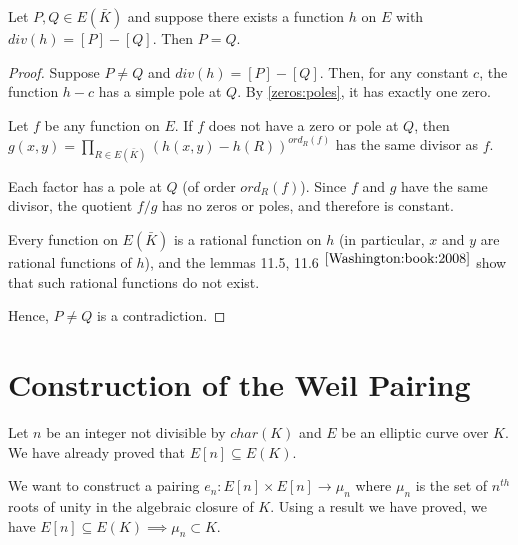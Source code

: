 \begin{lemma}
    Let $P, Q \in E(\bar{K})$ and suppose there exists a function $h$ on $E$ with $div(h) = [P] - [Q]$. Then $P = Q$.
\end{lemma}

\begin{proof}
    Suppose $P \neq Q$ and $div(h) = [P] - [Q]$. Then, for any constant $c$, the function $h - c$ has a simple pole at $Q$. By \ref{zeros:poles}, it has exactly one zero.  

    Let $f$ be any function on $E$. If $f$ does not have a zero or pole at $Q$, then \\ $g(x, y) =\prod\limits_{R \in E(\bar{K})} {\left( h(x, y) - h(R) \right)^{ord_R (f)}}$ has the same divisor as $f$. 

    Each factor has a pole at $Q$ (of order $ord_R(f)$). Since $f$ and $g$ have the same divisor, the quotient $f/g$ has no zeros or poles, and therefore is constant. 

    Every function on $E(\bar{K})$ is a rational function on $h$ (in particular, $x$ and $y$ are rational functions of $h$), and the lemmas 11.5, 11.6 $^{\cite{Washington:book:2008}}$ show that such rational functions do not exist. 
    
    Hence, $P \neq Q$ is a contradiction. 
\end{proof}

\section{Construction of the Weil Pairing}
Let $n$ be an integer not divisible by $char(K)$ and $E$ be an elliptic curve over $K$.  We have already proved that $E[n] \subseteq E(K)$.

We want to construct a pairing $e_n : E[n] \times E[n] \rightarrow \mu_n$ where $\mu_n$ is the set of $n^{th}$ roots of unity in the algebraic closure of $K$. Using a result we have proved, we have $E[n] \subseteq E(K) \implies \mu_n \subset K$. 

